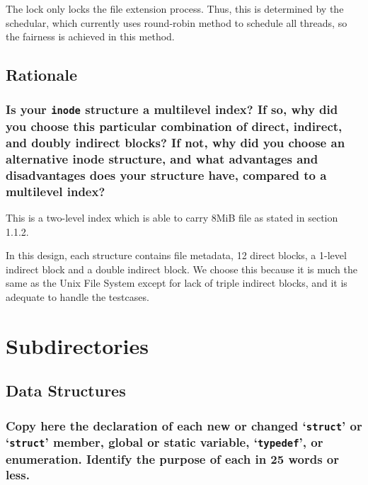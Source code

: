 \documentclass[sigconf, nonacm, balance=false, urlbreakonhyphens=true]{acmart}
\begin{document}
                The lock only locks the file extension process. Thus, this is determined by the schedular, which currently uses round-robin method to schedule all threads, so the fairness is achieved in this method. 
        
        \subsection{Rationale}
            
            \subsubsection{Is your \texttt{inode} structure a multilevel index?  If so, why did you choose this particular combination of direct, indirect, and doubly indirect blocks?  If not, why did you choose an alternative \texttt{}{inode} structure, and what advantages and disadvantages does your structure have, compared to a multilevel index? } 

                This is a two-level index which is able to carry 8MiB file as stated in section 1.1.2. 
                
                In this design, each structure contains file metadata, 12 direct blocks, a 1-level indirect block and a double indirect block. We choose this because it is much the same as the Unix File System except for lack of triple indirect blocks, and it is adequate to handle the testcases. 
    
    \section{Subdirectories}

        \label{Subdirectories}

        \subsection{Data Structures}
        
            \subsubsection{Copy here the declaration of each new or changed `\texttt{struct}' or `\texttt{struct}' member, global or static variable, `\texttt{typedef}', or enumeration. Identify the purpose of each in 25 words or less. }
    
\end{document}
